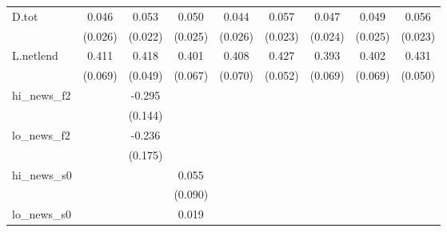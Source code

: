 {\begin{tabular}{l*{8}{c}}
D.tot       &       0.046\sym{*}  &       0.053\sym{**} &       0.050\sym{*}  &       0.044         &       0.057\sym{**} &       0.047\sym{*}  &       0.049\sym{*}  &       0.056\sym{**} \\
            &     (0.026)         &     (0.022)         &     (0.025)         &     (0.026)         &     (0.023)         &     (0.024)         &     (0.025)         &     (0.023)         \\
\addlinespace
L.netlend   &       0.411\sym{***}&       0.418\sym{***}&       0.401\sym{***}&       0.408\sym{***}&       0.427\sym{***}&       0.393\sym{***}&       0.402\sym{***}&       0.431\sym{***}\\
            &     (0.069)         &     (0.049)         &     (0.067)         &     (0.070)         &     (0.052)         &     (0.069)         &     (0.069)         &     (0.050)         \\
\addlinespace
hi\_news\_f2  &                     &      -0.295\sym{*}  &                     &                     &                     &                     &                     &                     \\
            &                     &     (0.144)         &                     &                     &                     &                     &                     &                     \\
\addlinespace
lo\_news\_f2  &                     &      -0.236         &                     &                     &                     &                     &                     &                     \\
            &                     &     (0.175)         &                     &                     &                     &                     &                     &                     \\
\addlinespace
hi\_news\_s0  &                     &                     &       0.055         &                     &                     &                     &                     &                     \\
            &                     &                     &     (0.090)         &                     &                     &                     &                     &                     \\
\addlinespace
lo\_news\_s0  &                     &                     &       0.019         &                     &                     &                     &                     &                     \\

\end{tabular}}
